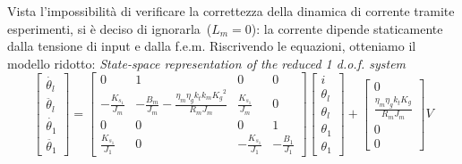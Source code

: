 Vista l'impossibilità di verificare la correttezza della dinamica di corrente tramite esperimenti, si è deciso di ignorarla~($L_m = 0$): la corrente dipende staticamente dalla tensione di input e dalla f.e.m. Riscrivendo le equazioni, otteniamo il modello ridotto:
\textit{State-space representation of the reduced 1 d.o.f. system}
\begin{equation}
	\begin{bmatrix}
		\dot{\theta_l} \\
		\ddot{\theta_l} \\
		\dot{\theta_1} \\
		\ddot{\theta_1}
	\end{bmatrix}
	=
	\begin{bmatrix}
		0 &1 & 0 & 0 \\
		-\frac{K_{s_1}}{J_m} & -\frac{B_m}{J_m}-\frac{\eta_m \eta_g k_t k_m {K_g}^2}{R_m J_m}  & \frac{K_{s_1}}{J_m} & 0 \\
		0 & 0 & 0 & 1 \\
		\frac{K_{s_1}}{J_1} & 0 & -\frac{K_{s_1}}{J_1} & -\frac{B_1}{J_1}
	\end{bmatrix}
	\begin{bmatrix}
		i \\
		\theta_l \\
		\theta_l \\
		\theta_1 \\
		\theta_1
	\end{bmatrix}
	+
	\begin{bmatrix}
		0 \\
		\frac{\eta_m \eta_g k_t K_g}{R_m J_m} \\
		0 \\
		0
	\end{bmatrix}
	V
\end{equation}

